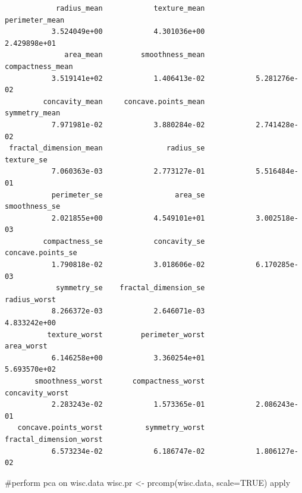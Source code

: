 \documentclass[
  letterpaper,
  DIV=11,
  numbers=noendperiod]{scrartcl}
\newenvironment{Shaded}{\begin{snugshade}}{\end{snugshade}}
\newcommand{\AttributeTok}[1]{\textcolor[rgb]{0.40,0.45,0.13}{#1}}
\newcommand{\CommentTok}[1]{\textcolor[rgb]{0.37,0.37,0.37}{#1}}
\newcommand{\ConstantTok}[1]{\textcolor[rgb]{0.56,0.35,0.01}{#1}}
\newcommand{\FunctionTok}[1]{\textcolor[rgb]{0.28,0.35,0.67}{#1}}
\newcommand{\NormalTok}[1]{\textcolor[rgb]{0.00,0.23,0.31}{#1}}
\newcommand{\OtherTok}[1]{\textcolor[rgb]{0.00,0.23,0.31}{#1}}
\begin{document}
\begin{verbatim}
            radius_mean            texture_mean          perimeter_mean 
           3.524049e+00            4.301036e+00            2.429898e+01 
              area_mean         smoothness_mean        compactness_mean 
           3.519141e+02            1.406413e-02            5.281276e-02 
         concavity_mean     concave.points_mean           symmetry_mean 
           7.971981e-02            3.880284e-02            2.741428e-02 
 fractal_dimension_mean               radius_se              texture_se 
           7.060363e-03            2.773127e-01            5.516484e-01 
           perimeter_se                 area_se           smoothness_se 
           2.021855e+00            4.549101e+01            3.002518e-03 
         compactness_se            concavity_se       concave.points_se 
           1.790818e-02            3.018606e-02            6.170285e-03 
            symmetry_se    fractal_dimension_se            radius_worst 
           8.266372e-03            2.646071e-03            4.833242e+00 
          texture_worst         perimeter_worst              area_worst 
           6.146258e+00            3.360254e+01            5.693570e+02 
       smoothness_worst       compactness_worst         concavity_worst 
           2.283243e-02            1.573365e-01            2.086243e-01 
   concave.points_worst          symmetry_worst fractal_dimension_worst 
           6.573234e-02            6.186747e-02            1.806127e-02 
\end{verbatim}

\begin{Shaded}
\begin{Highlighting}[]
\CommentTok{\#perform pca on wisc.data}
\NormalTok{wisc.pr }\OtherTok{\textless{}{-}} \FunctionTok{prcomp}\NormalTok{(wisc.data, }\AttributeTok{scale=}\ConstantTok{TRUE}\NormalTok{)}
\NormalTok{apply}
\end{Highlighting}
\end{Shaded}
\end{document}
